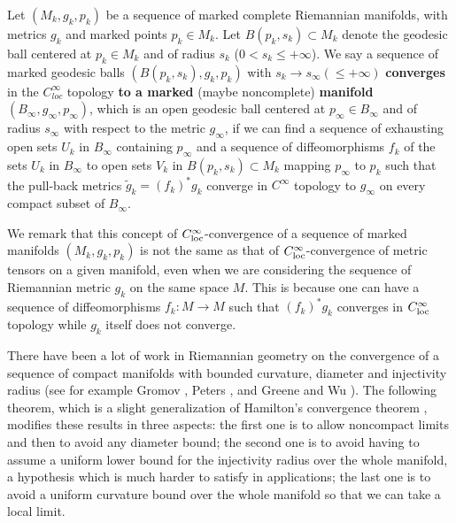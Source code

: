 \begin{definition}
  \label{def:cz-pointed-smooth-convergence-of-riemannian-manifolds}
Let $(M_k,g_k,p_k)$ be a sequence of marked complete Riemannian
manifolds, with metrics $g_k$ and marked points $p_k\in M_k$. Let
$B(p_k, s_k)\subset M_k$ denote the geodesic ball centered at
$p_k\in M_k$ and of radius $s_k$ ($0 < s_k \leq +\infty$). We say
a sequence of marked geodesic balls $(B(p_k,s_k),g_k, p_k)$ with
$s_k \rightarrow s_{\infty}(\leq +\infty)$ {\bf converges} in the
$C_{loc}^{\infty}$ topology {\bf to a marked} (maybe noncomplete)
{\bf manifold}
$(B_{\infty},g_{\infty},p_{\infty})$, which is an open geodesic
ball centered at $p_{\infty}\in B_{\infty}$ and of radius
$s_{\infty}$ with respect to the metric $g_{\infty}$, if we can
find a sequence of exhausting open sets $U_k$ in $B_{\infty}$
containing $p_{\infty}$ and a sequence of diffeomorphisms $f_k$ of
the sets $U_k$ in $B_{\infty}$ to open sets $V_k$ in $B(p_k,s_k)
\subset M_k$ mapping $p_{\infty}$ to $p_k$ such that the pull-back
metrics $\tilde{g}_k=(f_k)^*g_k$ converge in $C^\infty$ topology
to $g_{\infty}$ on every compact subset of $B_{\infty}$.
\end{definition}

We remark that this concept of $C_{\rm loc}^\infty$-convergence of
a sequence of marked manifolds $(M_k,g_k,p_k)$ is not the same as
that of $C_{\rm loc}^\infty$-convergence of metric tensors on a
given manifold, even when we are considering the sequence of
Riemannian metric $g_k$ on the same space $M$. This is because one
can have a sequence of diffeomorphisms $f_k: M\rightarrow M$ such
that $(f_k)^*g_k$ converges in $C^\infty_{\rm loc}$ topology while
$g_k$ itself does not converge.

There have been a lot of work in Riemannian geometry on the
convergence of a sequence of compact manifolds with bounded
curvature, diameter and injectivity radius (see for example Gromov
\cite{Gro}, Peters \cite{Pe}, and Greene and Wu \cite{Gre}). The
following theorem, which is a slight generalization of Hamilton's
convergence theorem \cite{Ha95}, modifies these results in three
aspects: the first one is to allow noncompact limits and then to
avoid any diameter bound; the second one is to avoid having to
assume a uniform lower bound for the injectivity radius over the
whole manifold, a hypothesis which is much harder to satisfy in
applications; the last one is to avoid a uniform curvature bound
over the whole manifold so that we can take a local limit.

